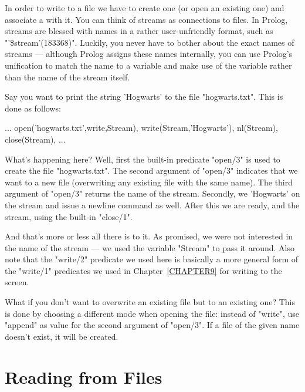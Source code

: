 In order to write to a file we have to create one (or open an existing
one) and associate a  with it. You can think of streams
as connections to files. In Prolog, streams are blessed with names in
a rather user-unfriendly format, such as
"'\$stream'(183368)". Luckily, you never have to bother about the
exact names of streams --- although Prolog assigns these names
internally, you can use Prolog's unification to match the name to a
variable and make use of the variable rather than the name of the
stream itself.

Say you want to print the string 'Hogwarts' to the file "hogwarts.txt".
This is done as follows:

\begin{LPNcodedisplay}
   ...
   open('hogwarts.txt',write,Stream),
   write(Stream,'Hogwarts'), nl(Stream),
   close(Stream),
   ...
\end{LPNcodedisplay}

What's happening here? Well, first the built-in predicate "open/3" is
used to create the file "hogwarts.txt". The second argument of
"open/3" indicates that we want to  a new file
(overwriting any existing file with the same name). The third argument
of "open/3" returns the name of the stream. Secondly, we
 'Hogwarts' on the stream and issue a newline command as
well. After this we are ready, and  the stream, using
the built-in "close/1".

And that's more or less all there is to it.  As promised, we were not
interested in the name of the stream --- we used the variable "Stream"
to pass it around. Also note that the "write/2" predicate we used here
is basically a more general form of the "write/1" predicates we used
in Chapter~\ref{CHAPTER9} for writing to the screen.

What if you don't want to overwrite an existing file but
 to an existing one? This is done by choosing a
different mode when opening the file: instead of "write", use "append"
as value for the second argument of "open/3".  If a file of the
given name doesn't exist, it will be created.






\section{Reading from Files}\label{SEC.L12.FILE.READING}

